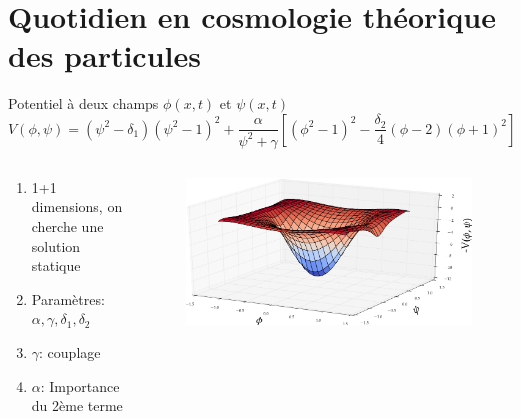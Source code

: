 \documentclass[handout]{beamer}
\begin{document}
\section{Quotidien en cosmologie théorique des particules}
\begin{frame}
\begin{block}{Potentiel à deux champs $\phi(x,t)$ et $\psi(x,t)$}
\begin{equation*}
V(\phi,\psi)=(\psi^2-\delta_1)(\psi^2-1)^2+\frac{\alpha}{\psi^2+\gamma}[(\phi^2-1)^2 - \frac{\delta_2}{4}(\phi-2)(\phi+1)^2] 
\end{equation*}

\end{block}
\begin{columns}[T]
    \begin{column}[T]{.5\linewidth}
  
\begin{enumerate}
\item 1+1 dimensions, on cherche une solution statique
\item Paramètres: $\alpha, \gamma, \delta_1, \delta_2$
\item $\gamma$: couplage
\item $\alpha$: Importance du 2ème terme 
\end{enumerate}  
    \end{column}
    \begin{column}[T]{.5\linewidth}
    \begin{figure}[0.3\textwidth]
    \includegraphics[scale=0.2]{Capture-2.png}
    \end{figure}
    \end{column}
  \end{columns}
\end{frame}
\end{document}
